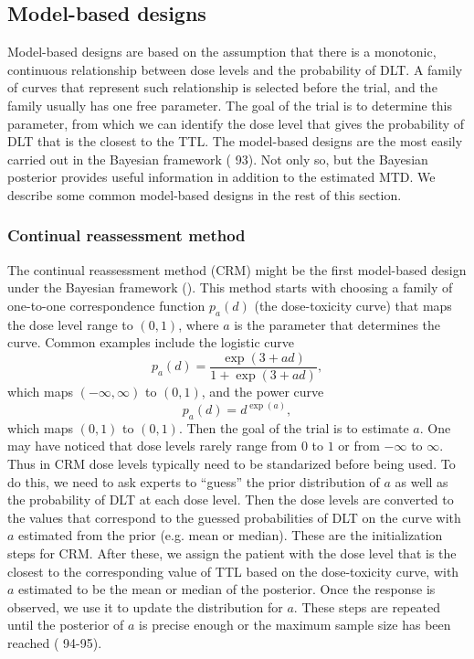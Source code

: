 \documentclass[12pt]{article}
\begin{document}
\subsection{Model-based designs}

Model-based designs are based on the assumption that there is a monotonic, continuous relationship between dose levels and the probability of DLT.
A family of curves that represent such relationship is selected before the trial, and the family usually has one free parameter.
The goal of the trial is to determine this parameter,
from which we can identify the dose level that gives the probability of DLT that is the closest to the TTL.
The model-based designs are the most easily carried out in the Bayesian framework (\cite{berry} 93).
Not only so, but the Bayesian posterior provides useful information in addition to the estimated MTD.
We describe some common model-based designs in the rest of this section.

\subsubsection{Continual reassessment method}

The continual reassessment method (CRM) might be the first model-based design under the Bayesian framework (\cite{oquigley}).
This method starts with choosing a family of one-to-one correspondence function $p_a(d)$ (the dose-toxicity curve) that maps the dose level range to $(0, 1)$, where $a$ is the parameter that determines the curve.
Common examples include the logistic curve
\[
  p_a(d) = \frac{\exp(3+ad)}{1+\exp(3+ad)},
\]
which maps $(-\infty, \infty)$ to $(0,1)$, and the power curve
\[
  p_a(d) = d^{\exp(a)},
\]
which maps $(0,1)$ to $(0,1)$.
Then the goal of the trial is to estimate $a$.
One may have noticed that dose levels rarely range from $0$ to $1$ or from $-\infty$ to $\infty$.
Thus in CRM dose levels typically need to be standarized before being used.
To do this, we need to ask experts to ``guess'' the prior distribution of $a$ as well as the probability of DLT at each dose level.
Then the dose levels are converted to the values that correspond to the guessed probabilities of DLT on the curve with $a$ estimated from the prior (e.g. mean or median).
These are the initialization steps for CRM.
After these, we assign the patient with the dose level that is the closest to the corresponding value of TTL based on the dose-toxicity curve,
with $a$ estimated to be the mean or median of the posterior. 
Once the response is observed, we use it to update the distribution for $a$.
These steps are repeated until the posterior of $a$ is precise enough or the maximum sample size has been reached (\cite{berry} 94-95).
\end{document}
